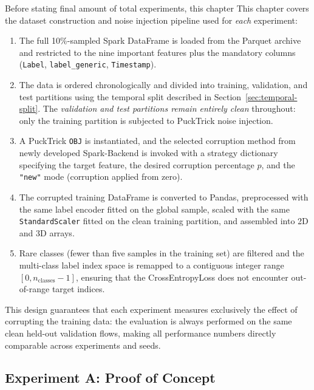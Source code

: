 \documentclass[../main.tex]{subfiles}
\begin{document}
Before stating final amount of total experiments, this chapter This chapter covers the dataset construction and noise injection pipeline used for \emph{each} experiment: 

\begin{enumerate}
    \item The full 10\%-sampled Spark DataFrame is loaded from the Parquet archive and restricted to the nine important features plus the mandatory columns (\texttt{Label}, \texttt{label\_generic}, \texttt{Timestamp}).
    \item The data is ordered chronologically and divided into training, validation, and test partitions using the temporal split described in Section~\ref{sec:temporal-split}.  The \emph{validation and test partitions remain entirely clean} throughout: only the training partition is subjected to PuckTrick noise injection.
    \item A PuckTrick \texttt{OBJ} is instantiated, and the selected corruption method from newly developed Spark-Backend is invoked with a strategy dictionary specifying the target feature, the desired corruption percentage $p$, and the \texttt{"new"} mode (corruption applied from zero).
    \item The corrupted training DataFrame is converted to Pandas, preprocessed with the same label encoder fitted on the global sample, scaled with the same \texttt{StandardScaler} fitted on the clean training partition, and assembled into 2D and 3D arrays.
    \item Rare classes (fewer than five samples in the training set) are filtered and the multi-class label index space is remapped to a contiguous integer range $[0, n_{\text{classes}}-1]$, ensuring that the CrossEntropyLoss does not encounter out-of-range target indices.
\end{enumerate}

This design guarantees that each experiment measures exclusively the effect of corrupting the training data: the evaluation is always performed on the same clean held-out validation flows, making all performance numbers directly comparable across experiments and seeds.


\newpage
\subsection{Experiment A: Proof of Concept}
\label{sec:exp-A-grid}
\end{document}
